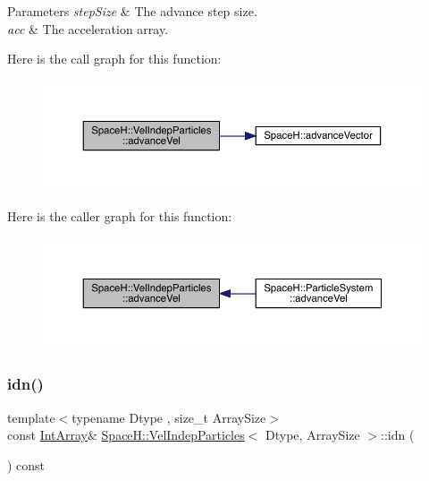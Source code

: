 \begin{DoxyParams}{Parameters}
{\em step\+Size} & The advance step size. \\
\hline
{\em acc} & The acceleration array. \\
\hline
\end{DoxyParams}
Here is the call graph for this function\+:
\nopagebreak
\begin{figure}[H]
\begin{center}
\leavevmode
\includegraphics[width=350pt]{class_space_h_1_1_vel_indep_particles_ac9344beddefc9182032c4966b70ff0c7_cgraph}
\end{center}
\end{figure}
Here is the caller graph for this function\+:
\nopagebreak
\begin{figure}[H]
\begin{center}
\leavevmode
\includegraphics[width=350pt]{class_space_h_1_1_vel_indep_particles_ac9344beddefc9182032c4966b70ff0c7_icgraph}
\end{center}
\end{figure}
\mbox{\label{class_space_h_1_1_vel_indep_particles_a6fde384478d19f53f0d325a8cda66ea5}} 
\subsubsection{\texorpdfstring{idn()}{idn()}\hspace{0.1cm}{\footnotesize\ttfamily [1/2]}}
{\footnotesize\ttfamily template$<$typename Dtype , size\+\_\+t Array\+Size$>$ \\
const \mbox{\hyperlink{class_space_h_1_1_vel_indep_particles_abe09426d740c8c2425c5fc3789c9c744}{Int\+Array}}\& \mbox{\hyperlink{class_space_h_1_1_vel_indep_particles}{Space\+H\+::\+Vel\+Indep\+Particles}}$<$ Dtype, Array\+Size $>$\+::idn (\begin{DoxyParamCaption}{ }\end{DoxyParamCaption}) const\hspace{0.3cm}{\ttfamily [inline]}}




